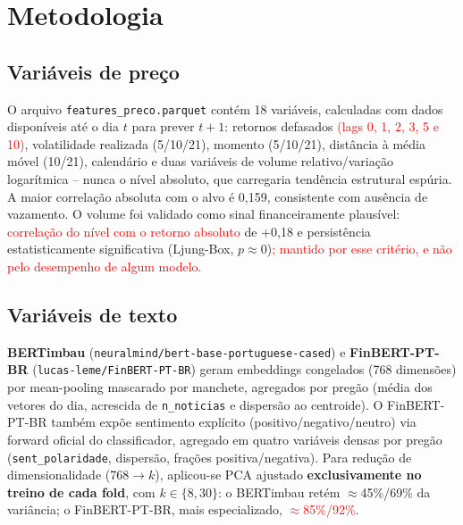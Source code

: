 \documentclass[conference]{IEEEtran}
\newcommand{\novo}[1]{\textcolor{red}{#1}}
\begin{document}
\section{Metodologia}

\subsection{Vari\'aveis de pre\c{c}o}
\label{sec:features-preco}
O arquivo \texttt{features\_preco.parquet} cont\'em 18 vari\'aveis, calculadas com dados dispon\'iveis at\'e o dia $t$ para prever $t+1$: retornos defasados \novo{(lags 0, 1, 2, 3, 5 e 10)}, volatilidade realizada (5/10/21), momento (5/10/21), dist\^ancia \`a m\'edia m\'ovel (10/21), calend\'ario e duas vari\'aveis de volume relativo/varia\c{c}\~ao logar\'itmica -- nunca o n\'ivel absoluto, que carregaria tend\^encia estrutural esp\'uria. A maior correla\c{c}\~ao absoluta com o alvo \'e 0,159, consistente com aus\^encia de vazamento. O volume foi validado como sinal financeiramente plaus\'ivel: \novo{correla\c{c}\~ao do n\'ivel com o retorno absoluto} de +0,18 \cite{karpoff1987} e persist\^encia estatisticamente significativa (Ljung-Box, $p\approx0$)\novo{; mantido por esse crit\'erio, e n\~ao pelo desempenho de algum modelo.}

\subsection{Vari\'aveis de texto}
\textbf{BERTimbau} (\texttt{neuralmind/\allowbreak bert-base-portuguese-cased}) e \textbf{FinBERT-PT-BR} (\texttt{lucas-leme/\allowbreak FinBERT-PT-BR}) geram embeddings congelados (768 dimens\~oes) por mean-pooling mascarado por manchete, agregados por preg\~ao (m\'edia dos vetores do dia, acrescida de \texttt{n\_noticias} e dispers\~ao ao centroide). O FinBERT-PT-BR tamb\'em expõe sentimento expl\'icito (positivo/negativo/neutro) via forward oficial do classificador, agregado em quatro vari\'aveis densas por preg\~ao (\texttt{sent\_polaridade}, dispers\~ao, fra\c{c}\~oes positiva/negativa). Para redu\c{c}\~ao de dimensionalidade (768$\to k$), aplicou-se PCA ajustado \textbf{exclusivamente no treino de cada fold}, com $k\in\{8,30\}$: o BERTimbau ret\'em $\approx$45\%/69\% da vari\^ancia; o FinBERT-PT-BR, mais especializado, \novo{$\approx$85\%/92\%}.
\end{document}
